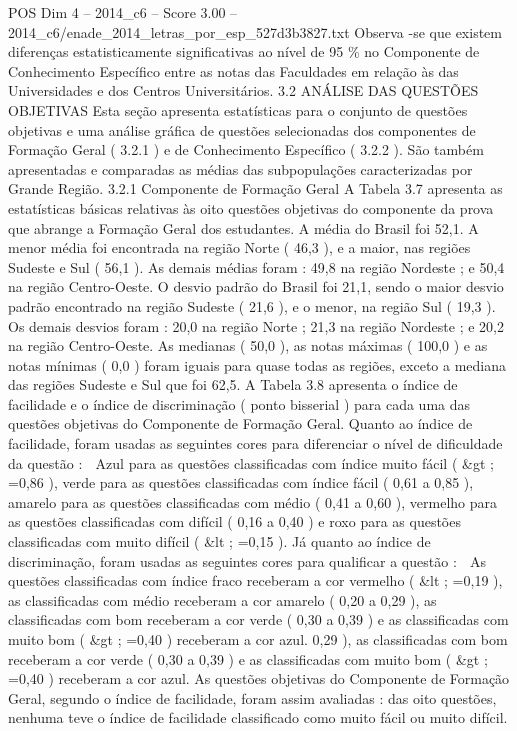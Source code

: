 \begin{textsample}{POS Dim 4 – 2014\_c6 – Score 3.00 – 2014\_c6/enade\_2014\_letras\_por\_esp\_527d3b3827.txt}
Observa -se que existem diferenças estatisticamente significativas ao nível de 95 \% no Componente de Conhecimento Específico entre as notas das Faculdades em relação às das Universidades e dos Centros Universitários. 3.2 ANÁLISE DAS QUESTÕES OBJETIVAS Esta seção apresenta estatísticas para o conjunto de questões objetivas e uma análise gráfica de questões selecionadas dos componentes de Formação Geral ( 3.2.1 ) e de Conhecimento Específico ( 3.2.2 ).
São também apresentadas e comparadas as médias das subpopulações caracterizadas por Grande Região. 3.2.1 Componente de Formação Geral A Tabela 3.7 apresenta as estatísticas básicas relativas às oito questões objetivas do componente da prova que abrange a Formação Geral dos estudantes.
A média do Brasil foi 52,1.
A menor média foi encontrada na região Norte ( 46,3 ), e a maior, nas regiões Sudeste e Sul ( 56,1 ).
As demais médias foram : 49,8 na região Nordeste ; e 50,4 na região Centro-Oeste.
O desvio padrão do Brasil foi 21,1, sendo o maior desvio padrão encontrado na região Sudeste ( 21,6 ), e o menor, na região Sul ( 19,3 ).
Os demais desvios foram : 20,0 na região Norte ; 21,3 na região Nordeste ; e 20,2 na região Centro-Oeste.
As medianas ( 50,0 ), as notas máximas ( 100,0 ) e as notas mínimas ( 0,0 ) foram iguais para quase todas as regiões, exceto a mediana das regiões Sudeste e Sul que foi 62,5.
A Tabela 3.8 apresenta o índice de facilidade e o índice de discriminação ( ponto bisserial ) para cada uma das questões objetivas do Componente de Formação Geral.
Quanto ao índice de facilidade, foram usadas as seguintes cores para diferenciar o nível de dificuldade da questão :  Azul para as questões classificadas com índice muito fácil ( \&gt ; =0,86 ), verde para as questões classificadas com índice fácil ( 0,61 a 0,85 ), amarelo para as questões classificadas com médio ( 0,41 a 0,60 ), vermelho para as questões classificadas com difícil ( 0,16 a 0,40 ) e roxo para as questões classificadas com muito difícil ( \&lt ; =0,15 ).
Já quanto ao índice de discriminação, foram usadas as seguintes cores para qualificar a questão :  As questões classificadas com índice fraco receberam a cor vermelho ( \&lt ; =0,19 ), as classificadas com médio receberam a cor amarelo ( 0,20 a 0,29 ), as classificadas com bom receberam a cor verde ( 0,30 a 0,39 ) e as classificadas com muito bom ( \&gt ; =0,40 ) receberam a cor azul. 0,29 ), as classificadas com bom receberam a cor verde ( 0,30 a 0,39 ) e as classificadas com muito bom ( \&gt ; =0,40 ) receberam a cor azul.
As questões objetivas do Componente de Formação Geral, segundo o índice de facilidade, foram assim avaliadas : das oito questões, nenhuma teve o índice de facilidade classificado como muito fácil ou muito difícil.

\end{textsample}
